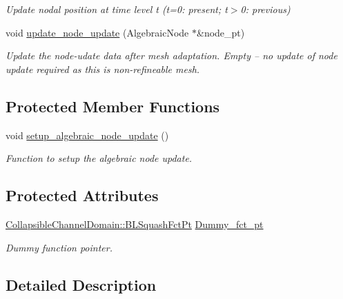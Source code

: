 \begin{DoxyCompactItemize}
\begin{DoxyCompactList}\small\item\em Update nodal position at time level t (t=0\+: present; t$>$0\+: previous) \end{DoxyCompactList}\item 
void \hyperlink{classoomph_1_1AlgebraicCollapsibleChannelMesh_abad38fb50d067a126af1161a3a603972}{update\+\_\+node\+\_\+update} (Algebraic\+Node $\ast$\&node\+\_\+pt)
\begin{DoxyCompactList}\small\item\em Update the node-\/udate data after mesh adaptation. Empty -- no update of node update required as this is non-\/refineable mesh. \end{DoxyCompactList}\end{DoxyCompactItemize}
\subsection*{Protected Member Functions}
\begin{DoxyCompactItemize}
\item 
void \hyperlink{classoomph_1_1AlgebraicCollapsibleChannelMesh_a54e93316a561cd77a68c0774d2772030}{setup\+\_\+algebraic\+\_\+node\+\_\+update} ()
\begin{DoxyCompactList}\small\item\em Function to setup the algebraic node update. \end{DoxyCompactList}\end{DoxyCompactItemize}
\subsection*{Protected Attributes}
\begin{DoxyCompactItemize}
\item 
\hyperlink{classoomph_1_1CollapsibleChannelDomain_a2bf1d7943bfac134a5c27a54c7e1faed}{Collapsible\+Channel\+Domain\+::\+B\+L\+Squash\+Fct\+Pt} \hyperlink{classoomph_1_1AlgebraicCollapsibleChannelMesh_ab3848ae5c357f45addf4bcfeca1a9d18}{Dummy\+\_\+fct\+\_\+pt}
\begin{DoxyCompactList}\small\item\em Dummy function pointer. \end{DoxyCompactList}\end{DoxyCompactItemize}


\subsection{Detailed Description}
